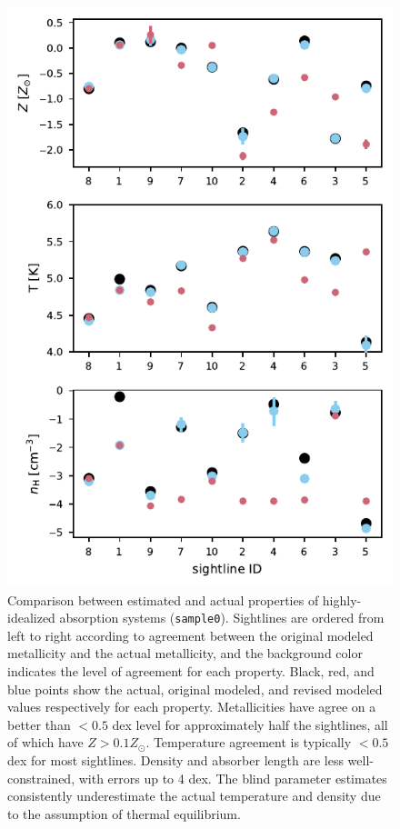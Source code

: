 \documentclass[fleqn,usenatbib]{mnras}
\begin{document}
\begin{figure}
    \centering
    \includegraphics[width=\columnwidth]{figures/sample0/comparison.pdf}
    \caption{
    Comparison between estimated and actual properties of highly-idealized absorption systems (\texttt{sample0}).
    Sightlines are ordered from left to right according to agreement between the original modeled metallicity and the actual metallicity, and the background color indicates the level of agreement for each property.
    Black, red, and blue points show the actual, original modeled, and revised modeled values respectively for each property.
    Metallicities have agree on a better than $<0.5$ dex level for approximately half the sightlines, all of which have $Z > 0.1 Z_\odot$.
    Temperature agreement is typically $<0.5$ dex for most sightlines.
    Density and absorber length are less well-constrained, with errors up to 4 dex.
    The blind parameter estimates consistently underestimate the actual temperature and density due to the assumption of thermal equilibrium.
    }
    \label{f: idealized}
\end{figure}
\end{document}
